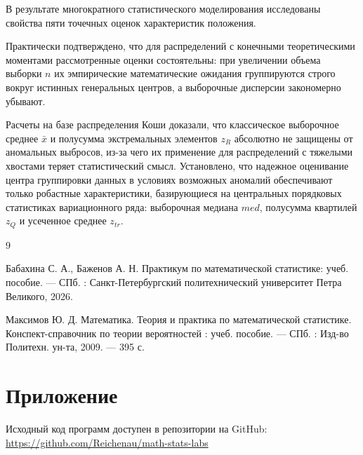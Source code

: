 \documentclass[a4paper, 14pt]{extarticle}
\begin{document}
В результате многократного статистического моделирования исследованы свойства пяти точечных оценок характеристик положения. 

Практически подтверждено, что для распределений с конечными теоретическими моментами рассмотренные оценки состоятельны: при увеличении объема выборки $n$ их эмпирические математические ожидания группируются строго вокруг истинных генеральных центров, а выборочные дисперсии закономерно убывают.

Расчеты на базе распределения Коши доказали, что классическое выборочное среднее $\bar{x}$ и полусумма экстремальных элементов $z_R$ абсолютно не защищены от аномальных выбросов, из-за чего их применение для распределений с тяжелыми хвостами теряет статистический смысл. Установлено, что надежное оценивание центра группировки данных в условиях возможных аномалий обеспечивают только робастные характеристики, базирующиеся на центральных порядковых статистиках вариационного ряда: выборочная медиана $med$, полусумма квартилей $z_Q$ и усеченное среднее $z_{tr}$. 

 
\renewcommand{\refname}{\thesection\ Список литературы}

\begin{thebibliography}{9}

    Бабахина С. А., Баженов А. Н. Практикум по математической статистике: учеб. пособие. — СПб. : Санкт-Петербургский политехнический университет Петра Великого, 2026. 

    Максимов Ю. Д. Математика. Теория и практика по математической статистике. Конспект-справочник по теории вероятностей : учеб. пособие. — СПб. : Изд-во Политехн. ун-та, 2009. — 395 с. 

\end{thebibliography}

\section{Приложение}

Исходный код программ доступен в репозитории на GitHub: \\
\url{https://github.com/Reichenau/math-stats-labs}
 
\end{document}

